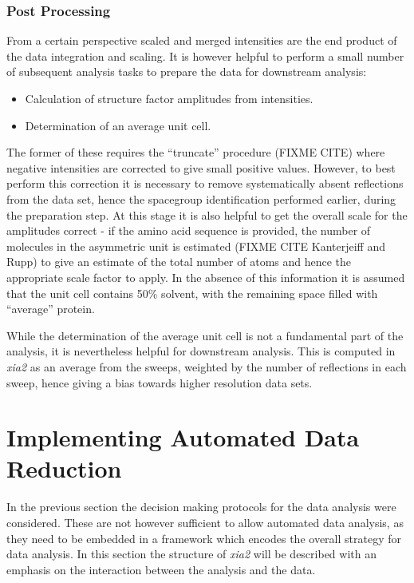 \documentclass[a4paper,11pt]{article}
\begin{document}
\subsubsection{Post Processing}

From a certain perspective scaled and merged intensities are the end
product of the data integration and scaling. It is however helpful to
perform a small number of subsequent analysis tasks to prepare the
data for downstream analysis:

\begin{itemize}
\item{Calculation of structure factor amplitudes from intensities.}
\item{Determination of an average unit cell.}
\end{itemize}

\noindent
The former of these requires the ``truncate'' procedure (FIXME CITE)
where negative intensities are corrected to give small positive
values. However, to best perform this correction it is necessary to
remove systematically absent reflections from the data set, hence the
spacegroup identification performed earlier, during the preparation
step. At this stage it is also helpful to get the overall scale for
the amplitudes correct - if the amino acid sequence is provided, the
number of molecules in the asymmetric unit is estimated (FIXME CITE
Kanterjeiff and Rupp) to give an estimate of the total number of atoms
and hence the appropriate scale factor to apply. In the absence of
this information it is assumed that the unit cell contains 50\%
solvent, with the remaining space filled with ``average'' protein. 

While the determination of the average unit cell is not a fundamental
part of the analysis, it is nevertheless helpful for downstream
analysis. This is computed in \emph{xia2} as an average from the
sweeps, weighted by the number of reflections in each sweep, hence
giving a bias towards higher resolution data sets.

\section{Implementing Automated Data Reduction}

In the previous section the decision making protocols for the data
analysis were considered. These are not however sufficient to allow
automated data analysis, as they need to be embedded in a framework
which encodes the overall strategy for data analysis. In this section
the structure of \emph{xia2} will be described with an emphasis on the
interaction between the analysis and the data.
\end{document}

